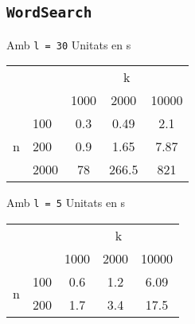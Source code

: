 \documentclass{article}
\begin{document}
\subsection{\texttt{WordSearch}}

Amb \verb|l = 30|
Unitats en s

\begin{tabular}{cl||c|c|c}
	\multicolumn{2}{c}{ } & \multicolumn{3}{c}{k} \\
	& & 1000 & 2000 & 10000 \\
	\cline{2-5}
	\multirow{3}{*}{n} 
	& 100 & 0.3 & 0.49 & 2.1 \\
	& 200 & 0.9 & 1.65 & 7.87 \\
	& 2000 & 78 & 266.5 & 821 \\
\end{tabular}

Amb \verb|l = 5|
Unitats en s

\begin{tabular}{cl||c|c|c}
	\multicolumn{2}{c}{ } & \multicolumn{3}{c}{k} \\
	& & 1000 & 2000 & 10000 \\
	\cline{2-5}
	\multirow{2}{*}{n} 
	& 100 & 0.6 & 1.2 & 6.09 \\
	& 200 & 1.7 & 3.4 & 17.5 \\
\end{tabular}
\end{document}
